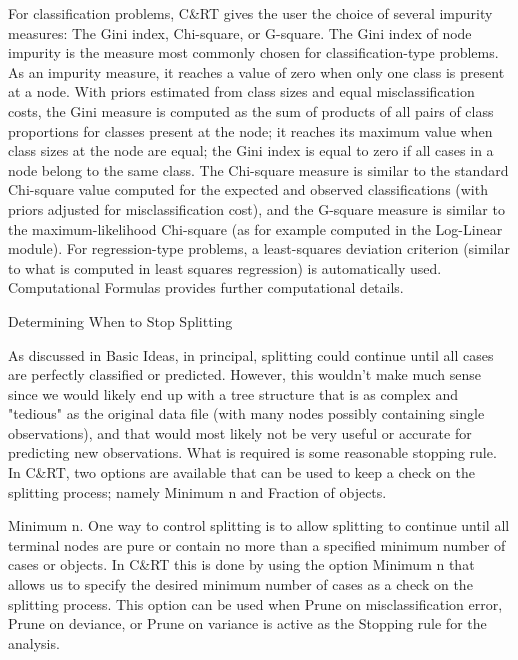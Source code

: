 For classification problems, C&RT gives the user the choice of several impurity measures: The Gini index, Chi-square, or G-square. The Gini index of node impurity is the measure most commonly chosen for classification-type problems. As an impurity measure, it reaches a value of zero when only one class is present at a node. With priors estimated from class sizes and equal misclassification costs, the Gini measure is computed as the sum of products of all pairs of class proportions for classes present at the node; it reaches its maximum value when class sizes at the node are equal; the Gini index is equal to zero if all cases in a node belong to the same class. The Chi-square measure is similar to the standard Chi-square value computed for the expected and observed classifications (with priors adjusted for misclassification cost), and the G-square measure is similar to the maximum-likelihood Chi-square (as for example computed in the Log-Linear module). For regression-type problems, a least-squares deviation criterion (similar to what is computed in least squares regression) is automatically used. Computational Formulas provides further computational details.

Determining When to Stop Splitting

As discussed in Basic Ideas, in principal, splitting could continue until all cases are perfectly classified or predicted. However, this wouldn't make much sense since we would likely end up with a tree structure that is as complex and "tedious" as the original data file (with many nodes possibly containing single observations), and that would most likely not be very useful or accurate for predicting new observations. What is required is some reasonable stopping rule. In C&RT, two options are available that can be used to keep a check on the splitting process; namely Minimum n and Fraction of objects.

Minimum n. One way to control splitting is to allow splitting to continue until all terminal nodes are pure or contain no more than a specified minimum number of cases or objects. In C&RT this is done by using the option Minimum n that allows us to specify the desired minimum number of cases as a check on the splitting process. This option can be used when Prune on misclassification error, Prune on deviance, or Prune on variance is active as the Stopping rule for the analysis.

